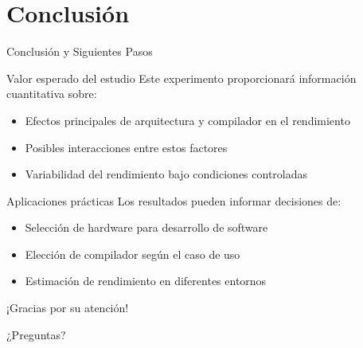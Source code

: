 \documentclass[aspectratio=169]{beamer}
\begin{document}
\section{Conclusión}

\begin{frame}{Conclusión y Siguientes Pasos}
    \begin{block}{Valor esperado del estudio}
        Este experimento proporcionará información cuantitativa sobre:
        \begin{itemize}
            \item Efectos principales de arquitectura y compilador en el rendimiento
            \item Posibles interacciones entre estos factores
            \item Variabilidad del rendimiento bajo condiciones controladas
        \end{itemize}
    \end{block}
    
    \begin{block}{Aplicaciones prácticas}
        Los resultados pueden informar decisiones de:
        \begin{itemize}
            \item Selección de hardware para desarrollo de software
            \item Elección de compilador según el caso de uso
            \item Estimación de rendimiento en diferentes entornos
        \end{itemize}
    \end{block}
\end{frame}

\begin{frame}[standout]
    ¡Gracias por su atención!
    
    ¿Preguntas?
\end{frame}
\end{document}
